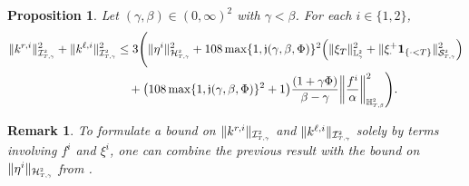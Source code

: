 \documentclass[10pt]{article} %
\newtheorem{proposition}[theorem]{Proposition}
\newtheorem{remark}[theorem]{Remark}
\newcommand\cH{\mathcal H}
\newcommand\cI{\mathcal I}
\newcommand\cS{\mathcal S}
\newcommand{\smalltext}[1]{\text{\fontsize{4}{4}\selectfont$#1$}}
\def \H{\mathbb{H}}
\def \L{\mathbb{L}}
\newcommand{\1}{\mathbf{1}}
\begin{document}
\begin{proposition}\label{prop::weighted_k_estimate}
	Let $(\gamma,\beta) \in (0,\infty)^2$ with $\gamma < \beta$. For each $i \in \{1,2\}$,
	\begin{align}\label{eq::weighted_k_inequality}
		\|k^{r,i}\|^2_{\cI^\smalltext{2}_{\smalltext{T}\smalltext{,}\smalltext{\gamma}}} + \|k^{\ell,i}\|^2_{\cI^\smalltext{2}_{\smalltext{T}\smalltext{,}\smalltext{\gamma}}} 
		&\leq 3 \Bigg( \|\eta^i\|^2_{\cH^\smalltext{2}_{\smalltext{T}\smalltext{,}\smalltext{\gamma}}} + 108 \max\{1, \mathfrak{j}(\gamma,\beta,\Phi)\}^2\Big(\|\xi_T\|^2_{\L^\smalltext{2}_\smalltext{\gamma}} + \|\xi^+_\cdot\mathbf{1}_{\{\cdot < T\}}\|^2_{\cS^\smalltext{2}_{\smalltext{T}\smalltext{,}\smalltext{\gamma}}} \Big) \nonumber\\
		&\quad + \big(108 \max\{1, \mathfrak{j}(\gamma,\beta,\Phi)\}^2 + 1\big)\frac{(1+\gamma\Phi)}{\beta-\gamma}\bigg\|\frac{f^i}{\alpha}\bigg\|^2_{\H^\smalltext{2}_{\smalltext{T}\smalltext{,}\smalltext{\beta}}} \Bigg).
	\end{align}
\end{proposition}

\begin{remark}
	To formulate a bound on $\|k^{r,i}\|_{\cI^\smalltext{2}_{\smalltext{T}\smalltext{,}\smalltext{\gamma}}}$ and $\|k^{\ell,i}\|_{\cI^\smalltext{2}_{\smalltext{T}\smalltext{,}\smalltext{\gamma}}}$ solely by terms involving $f^i$ and $\xi^i$, one can combine the previous result with the bound on $\|\eta^i\|_{\cH^\smalltext{2}_{\smalltext{T}\smalltext{,}\smalltext{\gamma}}}$ from {\rm{}}.
\end{remark}
\end{document}
